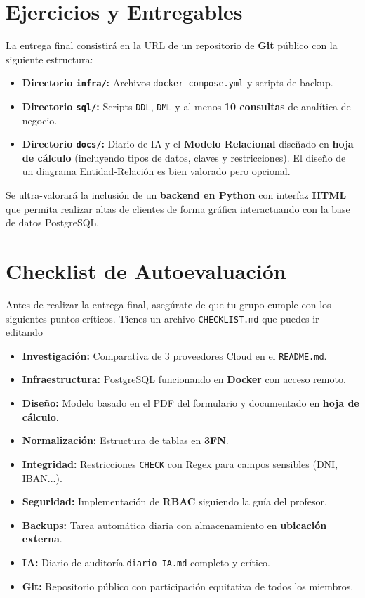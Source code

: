 \documentclass[12pt,a4paper,spanish,es-tabla,es-noshorthands]{article}
\begin{document}
\section{Ejercicios y Entregables}
La entrega final consistirá en la URL de un repositorio de \textbf{Git} público con la siguiente estructura:
\begin{itemize}
    \item \textbf{Directorio \texttt{infra/}:} Archivos \texttt{docker-compose.yml} y scripts de backup.
    \item \textbf{Directorio \texttt{sql/}:} Scripts \texttt{DDL}, \texttt{DML} y al menos \textbf{10 consultas} de analítica de negocio.
    \item \textbf{Directorio \texttt{docs/}:} Diario de IA y el \textbf{Modelo Relacional} diseñado en \textbf{hoja de cálculo} (incluyendo tipos de datos, claves y restricciones). El diseño de un diagrama Entidad-Relación es bien valorado pero opcional.
\end{itemize}

\begin{tcolorbox}[title=Valoración Extra (Puntos VIP)]
Se ultra-valorará la inclusión de un \textbf{backend en Python} con interfaz \textbf{HTML} que permita realizar altas de clientes de forma gráfica interactuando con la base de datos PostgreSQL.
\end{tcolorbox}

\section{Checklist de Autoevaluación}
Antes de realizar la entrega final, asegúrate de que tu grupo cumple con los siguientes puntos críticos. 
%
Tienes un archivo \texttt{CHECKLIST.md} que puedes ir editando

\begin{itemize}[label=O]
    \item \textbf{Investigación:} Comparativa de 3 proveedores Cloud en el \texttt{README.md}.
    \item \textbf{Infraestructura:} PostgreSQL funcionando en \textbf{Docker} con acceso remoto.
    \item \textbf{Diseño:} Modelo basado en el PDF del formulario y documentado en \textbf{hoja de cálculo}.
    \item \textbf{Normalización:} Estructura de tablas en \textbf{3FN}.
    \item \textbf{Integridad:} Restricciones \texttt{CHECK} con Regex para campos sensibles (DNI, IBAN...).
    \item \textbf{Seguridad:} Implementación de \textbf{RBAC} siguiendo la guía del profesor.
    \item \textbf{Backups:} Tarea automática diaria con almacenamiento en \textbf{ubicación externa}.
    \item \textbf{IA:} Diario de auditoría \texttt{diario\_IA.md} completo y crítico.
    \item \textbf{Git:} Repositorio público con participación equitativa de todos los miembros.
\end{itemize}
\end{document}
